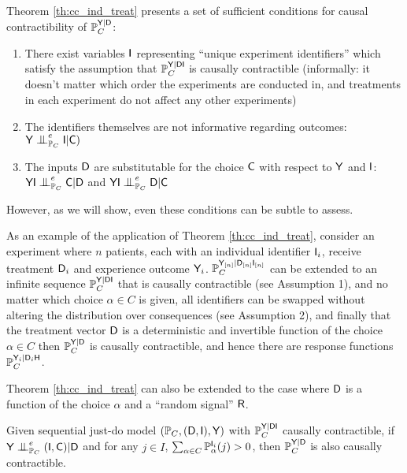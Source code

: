 Theorem \ref{th:cc_ind_treat} presents a set of sufficient conditions for causal contractibility of $\mathbb{P}_C^{\mathsf{Y}|\mathsf{D}}$:
\begin{enumerate}
    \item There exist variables $\mathsf{I}$ representing ``unique experiment identifiers'' which satisfy the assumption that $\mathbb{P}_C^{\mathsf{Y}|\mathsf{DI}}$ is causally contractible (informally: it doesn't matter which order the experiments are conducted in, and treatments in each experiment do not affect any other experiments)
    \item The identifiers themselves are not informative regarding outcomes: $\RV{Y}\CI_{\prob{P}_C}^e \RV{I}|\RV{C})$
    \item The inputs $\mathsf{D}$ are substitutable for the choice $\mathsf{C}$ with respect to $\mathsf{Y}$ and $\mathsf{I}$: $\RV{YI}\CI^e_{\prob{P}_C} \RV{C}|\RV{D}$ and $\RV{YI}\CI^e_{\prob{P}_C} \RV{D}|\RV{C}$
\end{enumerate}
However, as we will show, even these conditions can be subtle to assess.

As an example of the application of Theorem \ref{th:cc_ind_treat}, consider an experiment where $n$ patients, each with an individual identifier $\mathsf{I}_i$, receive treatment $\mathsf{D}_i$ and experience outcome $\mathsf{Y}_i$. $\mathbb{P}_C^{\mathsf{Y}_{[n]}|\mathsf{D}_{[n]}\mathsf{I}_{[n]}}$ can be extended to an infinite sequence $\mathbb{P}_C^{\mathsf{Y}|\mathsf{DI}}$ that is causally contractible (see Assumption 1), and no matter which choice $\alpha\in C$ is given, all identifiers can be swapped without altering the distribution over consequences (see Assumption 2), and finally that the treatment vector $\mathsf{D}$ is a deterministic and invertible function of the choice $\alpha\in C$ then $\mathbb{P}_C^{\mathsf{Y}|\mathsf{D}}$ is causally contractible, and hence there are response functions $\mathbb{P}_C^{\mathsf{Y}_i|\mathsf{D}_i\mathsf{H}}$.

Theorem \ref{th:cc_ind_treat} can also be extended to the case where $\mathsf{D}$ is a function of the choice $\alpha$ and a ``random signal'' $\mathsf{R}$.

\begin{lemma}\label{lem:ind_to_cc}
Given sequential just-do model $(\mathbb{P}_C,(\mathsf{D},\mathsf{I}),\mathsf{Y})$ with $\mathbb{P}_C^{\mathsf{Y}|\mathsf{DI}}$ causally contractible, if $\RV{Y}\CI_{\prob{P}_C}^e (\RV{I},\RV{C})|\RV{D}$ and for any $j\in I$, $\sum_{\alpha\in C} \mathbb{P}_\alpha^{\mathsf{I}_i}(j)>0$, then $\mathbb{P}_C^{\mathsf{Y}|\mathsf{D}}$ is also causally contractible.
\end{lemma}

